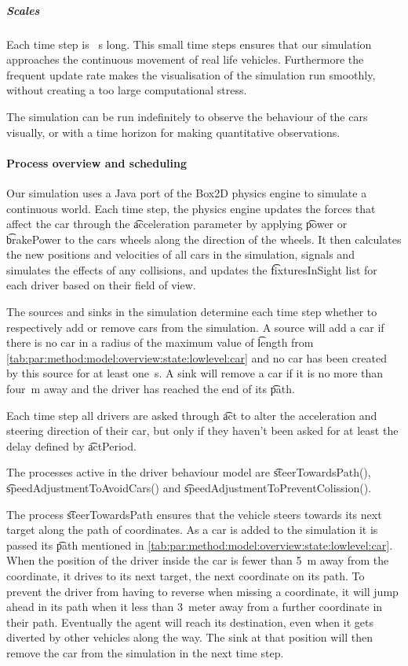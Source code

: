 \subparagraph{Scales}
Each time step is \si{s} long. This small time steps ensures that our simulation approaches the continuous movement of real life vehicles. Furthermore the frequent update rate makes the visualisation of the simulation run smoothly, without creating a too large computational stress.

The simulation can be run indefinitely to observe the behaviour of the cars visually, or with a time horizon for making quantitative observations.

\paragraph{Process overview and scheduling}
\label{par:method:model:overview:process}
Our simulation uses a Java port of the Box2D physics engine to simulate a continuous world. Each time step, the physics engine updates the forces that affect the car through the \t{acceleration} parameter by applying \t{power} or \t{brakePower} to the cars wheels along the direction of the wheels. It then calculates the new positions and velocities of all cars in the simulation, signals and simulates the effects of any collisions, and updates the \t{fixturesInSight} list for each driver based on their field of view.

The sources and sinks in the simulation determine each time step whether to respectively add or remove cars from the simulation. A source will add a car if there is no car in a radius of the maximum value of \t{length} from \cref{tab:par:method:model:overview:state:lowlevel:car} and no car has been created by this source for at least \si{one \second}. A sink will remove a car if it is no more than \si{four \meter} away and the driver has reached the end of its \t{path}.

Each time step all drivers are asked through \t{act} to alter the acceleration and steering direction of their car, but only if they haven't been asked for at least the delay defined by \t{actPeriod}.

The processes active in the driver behaviour model are \t{steerTowardsPath()}, \t{speedAdjustmentToAvoidCars()} and \t{speedAdjustmentToPreventColission()}.

The process \t{steerTowardsPath} ensures that the vehicle steers towards its next target along the path of coordinates. As a car is added to the simulation it is passed its \t{path} mentioned in \cref{tab:par:method:model:overview:state:lowlevel:car}. When the position of the driver inside the car is fewer than \si{5\meter} away from the coordinate, it drives to its next target, the next coordinate on its path. To prevent the driver from having to reverse when missing a coordinate, it will jump ahead in its path when it less than \si{3 meter} away from a further coordinate in their path. Eventually the agent will reach its destination, even when it gets diverted by other vehicles along the way. The sink at that position will then remove the car from the simulation in the next time step.


